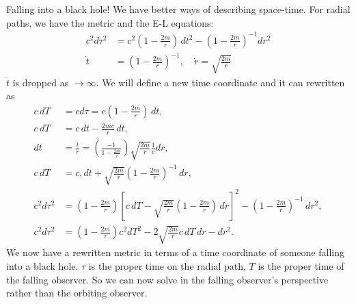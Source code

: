 \documentclass[a4paper, 11pt, normalem]{report}
\begin{document}
\chapter{}
Falling into a black hole!
We have better ways of describing space-time.
For radial paths, we have the metric and the E-L equations:
\begin{align}
    c^2d\tau^2 &= c^2\left(1-\frac{2m}{r}\right)\,dt^2 - \left(1-\frac{2m}{r}\right)^{-1}dr^2 \\
    \dot{t} &= \left(1-\frac{2m}{r}\right)^{-1},\quad \dot{r} = \sqrt{\frac{2m}{r}}
\end{align}
$\dot{t}$ is dropped as $\to\infty$.
We will define a new time coordinate and it can rewritten as
\begin{align}
    c\,dT &= cd\tau = c\left(1-\frac{2m}{r}\right)\,dt, \\
    c\,dT &= c\,dt - \frac{2mc}{r}\,dt,\\
    dt &= \frac{\dot{t}}{\dot{r}} = \left(\frac{-1}{1-\frac{2m}{r}}\right)\sqrt{\frac{2m}{r}}\frac{1}{c}dr, \\
    c\,dT &= c,dt + \sqrt{\frac{2m}{r}}\left(1-\frac{2m}{r}\right)^{-1}\,dr, \\
    c^2d\tau^2 &= \left(1-\frac{2m}{r}\right)\left[c\,dT - \sqrt{\frac{2m}{r}}\left(1-\frac{2m}{r}\right)\,dr\right]^2 - \left(1-\frac{2m}{r}\right)^{-1}\,dr^2, \\
    c^2d\tau^2 &= \left(1-\frac{2m}{r}\right)c^2dT^2 - 2\sqrt{\frac{2m}{r}}c\,dT\,dr - dr^2.
\end{align}
We now have a rewritten metric in terms of a time coordinate of someone falling into a black hole.
$\tau$ is the proper time on the radial path, $T$ is the proper time of the falling observer.
So we can now solve in the falling observer's perspective rather than the orbiting observer.
\end{document}
